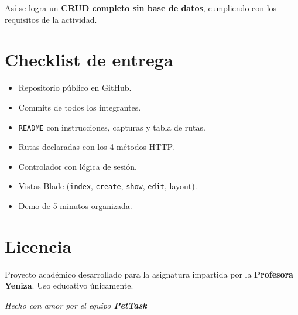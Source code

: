 \documentclass[11pt,a4paper]{article}
\begin{document}
Así se logra un \textbf{CRUD completo sin base de datos}, cumpliendo con los requisitos de la actividad.

\section{Checklist de entrega}

\begin{itemize}[leftmargin=1.5em]
    \item[$\boxtimes$] Repositorio público en GitHub.
    \item[$\boxtimes$] Commits de todos los integrantes.
    \item[$\boxtimes$] \texttt{README} con instrucciones, capturas y tabla de rutas.
    \item[$\boxtimes$] Rutas declaradas con los 4 métodos HTTP.
    \item[$\boxtimes$] Controlador con lógica de sesión.
    \item[$\boxtimes$] Vistas Blade (\texttt{index}, \texttt{create}, \texttt{show}, \texttt{edit}, layout).
    \item[$\boxtimes$] Demo de 5 minutos organizada.
\end{itemize}

\section{Licencia}

Proyecto académico desarrollado para la asignatura impartida por la \textbf{Profesora Yeniza}. Uso educativo únicamente.

\vspace{1cm}
\begin{center}
\textit{Hecho con amor por el equipo \textbf{PetTask}}
\end{center}
\end{document}
